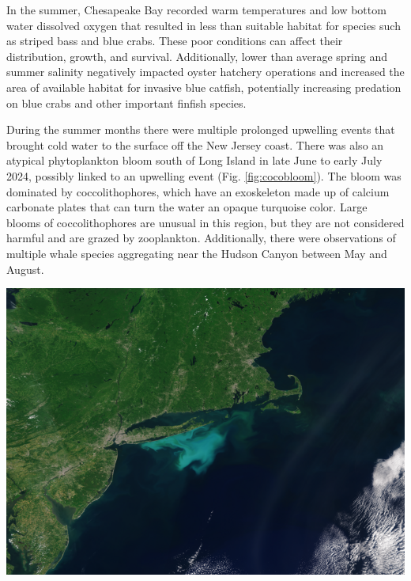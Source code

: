 \documentclass[
  10pt,
]{article}
\let\origfigure\figure
\let\endorigfigure\endfigure
\renewenvironment{figure}[1][2] {
    \expandafter\origfigure\expandafter[H]
} {
    \endorigfigure
}
\begin{document}
In the summer, Chesapeake Bay recorded warm temperatures and low bottom water dissolved oxygen that resulted in less than suitable habitat for species such as striped bass and blue crabs. These poor conditions can affect their distribution, growth, and survival. Additionally, lower than average spring and summer salinity negatively impacted oyster hatchery operations and increased the area of available habitat for invasive blue catfish, potentially increasing predation on blue crabs and other important finfish species.

During the summer months there were multiple prolonged upwelling events that brought cold water to the surface off the New Jersey coast. There was also an atypical phytoplankton bloom south of Long Island in late June to early July 2024, possibly linked to an upwelling event (Fig. \ref{fig:cocobloom}). The bloom was dominated by coccolithophores, which have an exoskeleton made up of calcium carbonate plates that can turn the water an opaque turquoise color. Large blooms of coccolithophores are unusual in this region, but they are not considered harmful and are grazed by zooplankton. Additionally, there were observations of multiple whale species aggregating near the Hudson Canyon between May and August.

\begin{figure}

{\centering \includegraphics[width=0.55\linewidth]{midatlantic_files/figure-latex/cocobloom-1} 

}

\caption{An OLCI Sentinel 3A true color image with enhanced contrast captured on July 2, 2024. Coccolithophores shed their coccolith plates during the later stages of the bloom cycle, which results in the milky turquoise water color (Image credit: NOAA STAR, OCView and Ocean Color Science Team).}\label{fig:cocobloom}
\end{figure}
\end{document}
